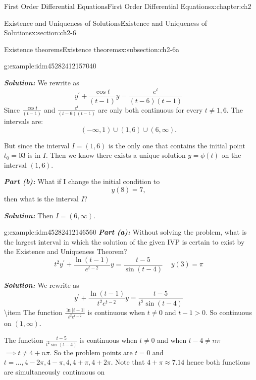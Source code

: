 \documentclass[oneside,10pt,]{book}
\newcommand{\alert}[1]{\textbf{\textit{#1}}}
\numberwithin{equation}{section}
\numberwithin{equation}{section}
\begin{document}
\begin{chapterptx}{First Order Differential Equations}{}{First Order Differential Equations}{}{}{x:chapter:ch2}
\begin{sectionptx}{Existence and Uniqueness of Solutions}{}{Existence and Uniqueness of Solutions}{}{}{x:section:ch2-6}
\begin{subsectionptx}{Existence theorems}{}{Existence theorems}{}{}{x:subsection:ch2-6a}
\begin{example}{}{g:example:idm45282412157040}
\begin{equation*}
\end{equation*}
%
\par
\alert{Solution:} We rewrite as%
\begin{equation*}
y^{\prime}+\frac{\cos t}{(t-1)}y=\frac{e^{t}}{\left(t-6\right)(t-1)}
\end{equation*}
Since \(\frac{\cos t}{(t-1)}\) and \(\frac{e^{t}}{\left(t-6\right)(t-1)}\) are only both continuous for every \(t\neq1,6\). The intervals are:%
\begin{equation*}
\left(-\infty,1\right)\cup\left(1,6\right)\cup\left(6,\infty\right).
\end{equation*}
%
\par
But since the interval \(I=(1,6)\) is the only one that contains the initial point \(t_{0}=03\) is in \(I\). Then we know there exists a unique solution \(y=\phi(t)\) on the interval \((1,6)\).%
\par
\alert{Part (b):} What if I change the initial condition to%
\begin{equation*}
y(8)=7,
\end{equation*}
then what is the interval \(I\)?%
\par
\alert{Solution:} Then \(I=\left(6,\infty\right)\).%
\end{example}
\begin{example}{}{g:example:idm45282412146560}%
\alert{Part (a):} Without solving the problem, what is the largest interval in which the solution of the given IVP is certain to exist by the Existence and Uniqueness Theorem?%
\begin{equation*}
t^{2}y^{\prime}+\frac{\ln\left(t-1\right)}{e^{t-2}}y=\frac{t-5}{\sin(t-4)}\,\,\,\,\,\,\,y(3)=\pi
\end{equation*}
%
\par
\alert{Solution:} We rewrite as%
\begin{equation*}
y^{\prime}+\frac{\ln\left(t-1\right)}{t^{2}e^{t-2}}y=\frac{t-5}{t^{2}\sin(t-4)}
\end{equation*}
\textbackslash{}item The function \(\frac{\ln\left|t-1\right|}{t^{2}e^{t-2}}\) is continuous when \(t\neq0\) and \(t-1>0\). So continuous on \((1,\infty)\).%
\par
The function \(\frac{t-5}{t^{2}\sin(t-4)}\) is continuous when \(t\neq0\) and when \(t-4\neq n\pi\) \(\implies t\neq4+n\pi\). So the problem points are \(t=0\) and \(t=\dots,4-2\pi,4-\pi,4,4+\pi,4+2\pi\). Note that \(4+\pi\approx7.14\) hence both functions are simultaneously continuous on%
\begin{equation*}

\end{equation*}
\end{example}
\end{subsectionptx}
\end{sectionptx}
\end{chapterptx}
\end{document}
